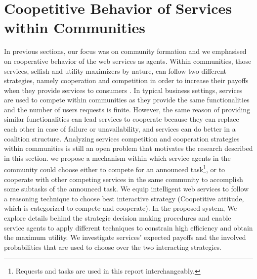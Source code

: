 


\section{Coopetitive Behavior of Services within Communities}\label{s:coop}

In previous sections, our focus was on community formation and we emphasised on cooperative behavior of the web services as agents. Within communities, those services, selfish and utility maximizers by nature, can follow two different strategies, namely cooperation and competition in order to increase their payoffs when they provide services to consumers \cite{VuFind-10008938119}. In typical business settings, services are used to compete within communities as they provide the same functionalities and the number of users requests is finite. However, the same reason of providing similar functionalities can lead services to cooperate because they can replace each other in case of failure or unavailability, and services can do better in a coalition structure. Analyzing services competition and cooperation strategies within communities is still an open problem that motivates the research described in this section. we propose a mechanism within which service agents
in the community could choose either to compete for an announced task\footnote{Requests and tasks are used in this report interchangeably.}, or to cooperate with other competing services in the same community to accomplish some subtasks of the announced task. We equip intelligent web services to follow a reasoning technique to choose best interactive strategy (Coopetitive attitude, which is categorized to compete and cooperate). In the proposed system, We explore details behind the strategic decision making procedures and enable service agents to apply different techniques to constrain high efficiency and obtain the maximum utility. We investigate services' expected payoffs and the involved probabilities that are used to choose over the two interacting strategies.



